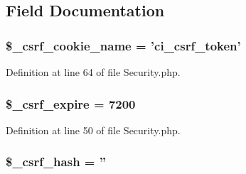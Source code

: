 \subsection{Field Documentation}
\hypertarget{class_c_i___security_a52043f2c9ffb0e14eade8e67a0172a82}{
\subsubsection[{\$\-\_\-csrf\-\_\-cookie\-\_\-name}]{\setlength{\rightskip}{0pt plus 5cm}\$\-\_\-csrf\-\_\-cookie\-\_\-name = 'ci\-\_\-csrf\-\_\-token'\hspace{0.3cm}{\ttfamily [protected]}}}\label{class_c_i___security_a52043f2c9ffb0e14eade8e67a0172a82}


Definition at line 64 of file Security.\-php.

\hypertarget{class_c_i___security_af86a83f20de2a3c522bf690d4080c08e}{
\subsubsection[{\$\-\_\-csrf\-\_\-expire}]{\setlength{\rightskip}{0pt plus 5cm}\$\-\_\-csrf\-\_\-expire = 7200\hspace{0.3cm}{\ttfamily [protected]}}}\label{class_c_i___security_af86a83f20de2a3c522bf690d4080c08e}


Definition at line 50 of file Security.\-php.

\hypertarget{class_c_i___security_a8bf24cc529f04164ac20d892ce20d721}{
\subsubsection[{\$\-\_\-csrf\-\_\-hash}]{\setlength{\rightskip}{0pt plus 5cm}\$\-\_\-csrf\-\_\-hash = ''\hspace{0.3cm}{\ttfamily [protected]}}}\label{class_c_i___security_a8bf24cc529f04164ac20d892ce20d721}


